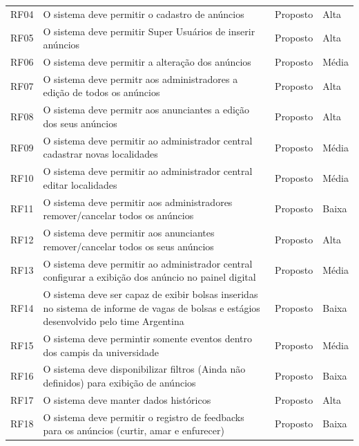 \documentclass[a4paper, 12pt]{article}
\begin{document}
\begin{table}[ht]
    \centering
    \begin{tabular}{p{2cm}p{7cm}p{2cm}p{2cm}}
        \hline

        RF04&O sistema deve permitir o cadastro de an\'{u}ncios&Proposto&Alta\\
        RF05&O sistema deve permitir Super Usu\'{a}rios de inserir an\'{u}ncios&Proposto&Alta\\
        RF06&O sistema deve permitir a altera\c{c}\~{a}o dos an\'{u}ncios&Proposto&M\'{e}dia\\
        RF07&O sistema deve permitr aos administradores a edi\c{c}\~{a}o de todos os an\'{u}ncios&Proposto&Alta\\
        RF08&O sistema deve permitr aos anunciantes a edi\c{c}\~{a}o dos seus an\'{u}ncios&Proposto&Alta\\
        RF09&O sistema deve permitir ao administrador central cadastrar novas localidades&Proposto&M\'{e}dia\\
        RF10&O sistema deve permitir ao administrador central editar localidades&Proposto&M\'{e}dia\\
        RF11&O sistema deve permitir aos administradores remover/cancelar todos os an\'{u}ncios&Proposto&Baixa\\
        RF12&O sistema deve permitir aos anunciantes remover/cancelar todos os seus an\'{u}ncios&Proposto&Alta\\
        RF13&O sistema deve permitir ao administrador central configurar a exibi\c{c}\~{a}o dos an\'{u}ncio no painel digital&Proposto&M\'{e}dia\\
        RF14&O sistema deve ser capaz de exibir bolsas inseridas no sistema de informe de vagas de bolsas e estágios desenvolvido pelo time Argentina&Proposto&Baixa\\
        RF15&O sistema deve permintir somente eventos dentro dos campis da universidade&Proposto&M\'{e}dia\\
        RF16&O sistema deve disponibilizar filtros (Ainda n\~{a}o definidos) para exibi\c{c}\~{a}o de an\'{u}ncios&Proposto&Baixa\\
        RF17&O sistema deve manter dados hist\'{o}ricos&Proposto&Alta\\
        RF18&O sistema deve permitir o registro de feedbacks para os an\'{u}ncios (curtir, amar e enfurecer)&Proposto&Baixa\\
		\hline
	\end{tabular}
\end{table}
\newpage
\end{document}

